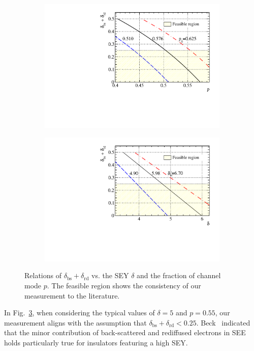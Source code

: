 \begin{figure}[!htbp]
	\centering
	\begin{subfigure}{0.5\textwidth}
		\centering
		\includegraphics[width=0.95\linewidth]{PMTRelated/GTmodel/parameter_pp0.pdf}
		\caption{}
		\label{fig:pp0}
	\end{subfigure}%
	\hfill
	\begin{subfigure}{0.5\textwidth}
		\centering
		\includegraphics[width=0.95\linewidth]{PMTRelated/GTmodel/parameters_ts.pdf}
		\caption{}
		\label{fig:tsts}
	\end{subfigure}
	\caption{Relations of \(\delta_\text{bs} + \delta_\text{rd}\) vs. the SEY \(\delta\) and the fraction of channel mode \(p\).
		The feasible region shows the consistency of our measurement to the literature.}
	\label{fig:pdelta}
\end{figure}

In Fig.~\ref{fig:pdelta}, when considering the typical values of \(\delta = 5\) and \(p = 0.55\), our measurement aligns with the assumption that \(\delta_\text{bs}+\delta_\text{rd}<0.25\). Beck~\cite{beck_physical_1966} indicated that the minor contribution of back-scattered and rediffused electrons in SEE holds particularly true for insulators featuring a high SEY.


